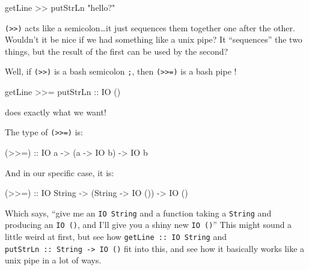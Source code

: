\documentclass[]{article}
\newenvironment{Shaded}{\begin{snugshade}}{\end{snugshade}}
\newcommand{\DataTypeTok}[1]{\textcolor[rgb]{0.13,0.29,0.53}{#1}}
\newcommand{\FunctionTok}[1]{\textcolor[rgb]{0.00,0.00,0.00}{#1}}
\newcommand{\NormalTok}[1]{#1}
\newcommand{\OtherTok}[1]{\textcolor[rgb]{0.56,0.35,0.01}{#1}}
\newcommand{\StringTok}[1]{\textcolor[rgb]{0.31,0.60,0.02}{#1}}
\begin{document}
\begin{Shaded}
\begin{Highlighting}[]
\NormalTok{getLine }\FunctionTok{>>}\NormalTok{ putStrLn }\StringTok{"hello?"}
\end{Highlighting}
\end{Shaded}

\texttt{(\textgreater{}\textgreater{})} acts like a semicolon\ldots{}it just
sequences them together one after the other. Wouldn't it be nice if we had
something like a unix pipe? It ``sequences'' the two things, but the result of
the first can be used by the second?

Well, if \texttt{(\textgreater{}\textgreater{})} is a bash semicolon \texttt{;},
then \texttt{(\textgreater{}\textgreater{}=)} is a bash pipe
\texttt{\textbar{}}!

\begin{Shaded}
\begin{Highlighting}[]
\NormalTok{getLine }\FunctionTok{>>=}\NormalTok{ putStrLn}
\OtherTok{                      ::} \DataTypeTok{IO}\NormalTok{ ()}
\end{Highlighting}
\end{Shaded}

does exactly what we want!

The type of \texttt{(\textgreater{}\textgreater{}=)} is:

\begin{Shaded}
\begin{Highlighting}[]
\OtherTok{(>>=) ::} \DataTypeTok{IO}\NormalTok{ a }\OtherTok{->}\NormalTok{ (a }\OtherTok{->} \DataTypeTok{IO}\NormalTok{ b) }\OtherTok{->} \DataTypeTok{IO}\NormalTok{ b}
\end{Highlighting}
\end{Shaded}

And in our specific case, it is:

\begin{Shaded}
\begin{Highlighting}[]
\OtherTok{(>>=) ::} \DataTypeTok{IO} \DataTypeTok{String} \OtherTok{->}\NormalTok{ (}\DataTypeTok{String} \OtherTok{->} \DataTypeTok{IO}\NormalTok{ ()) }\OtherTok{->} \DataTypeTok{IO}\NormalTok{ ()}
\end{Highlighting}
\end{Shaded}

Which says, ``give me an \texttt{IO\ String} and a function taking a
\texttt{String} and producing an \texttt{IO\ ()}, and I'll give you a shiny new
\texttt{IO\ ()}'' This might sound a little weird at first, but see how
\texttt{getLine\ ::\ IO\ String} and
\texttt{putStrLn\ ::\ String\ -\textgreater{}\ IO\ ()} fit into this, and see
how it basically works like a unix pipe in a lot of ways.
\end{document}
